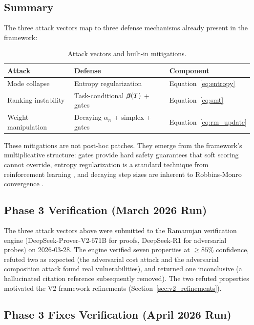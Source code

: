 \subsection{Summary}

The three attack vectors map to three defense mechanisms already present in the framework:

\begin{table}[h]
\centering
\caption{Attack vectors and built-in mitigations.}
\label{tab:adversarial}
\small
\begin{tabular}{lll}
\toprule
\textbf{Attack} & \textbf{Defense} & \textbf{Component} \\
\midrule
Mode collapse & Entropy regularization & Equation~\ref{eq:entropy} \\
Ranking instability & Task-conditional $\boldsymbol{\beta}(T)$ + gates & Equation~\ref{eq:smt} \\
Weight manipulation & Decaying $\alpha_n$ + simplex + gates & Equation~\ref{eq:rm_update} \\
\bottomrule
\end{tabular}
\end{table}

These mitigations are not post-hoc patches. They emerge from the framework's multiplicative structure: gates provide hard safety guarantees that soft scoring cannot override, entropy regularization is a standard technique from reinforcement learning \citep{haarnoja2018sac}, and decaying step sizes are inherent to Robbins-Monro convergence \citep{robbins1951stochastic}.

\subsection{Phase 3 Verification (March 2026 Run)}
\label{sec:phase3_verification}

The three attack vectors above were submitted to the Ramanujan verification engine (DeepSeek-Prover-V2-671B for proofs, DeepSeek-R1 for adversarial probes) on 2026-03-28. The engine verified seven properties at $\geq 85\%$ confidence, refuted two as expected (the adversarial cost attack and the adversarial composition attack found real vulnerabilities), and returned one inconclusive (a hallucinated citation reference subsequently removed). The two refuted properties motivated the V2 framework refinements (Section~\ref{sec:v2_refinements}).

\subsection{Phase 3 Fixes Verification (April 2026 Run)}
\label{sec:phase3_fixes_verification}

